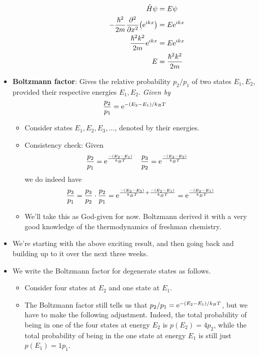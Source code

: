 \documentclass[../notes.tex]{subfiles}
\begin{document}
\begin{itemize}
\begin{itemize}
\begin{itemize}
            \begin{align*}
                \hat{H}\psi &= E\psi\\
                -\frac{\hbar^2}{2m}\pdv[2]{x}(\e[ikx]) &= E\e[ikx]\\
                \frac{\hbar^2k^2}{2m}\e[ikx] &= E\e[ikx]\\
                E &= \frac{\hbar^2k^2}{2m}
            \end{align*}
        \end{itemize}
    \end{itemize}
    \item \textbf{Boltzmann factor}: Gives the relative probability $p_2/p_1$ of two states $E_1,E_2$, provided their respective energies $E_1,E_2$. \emph{Given by}
    \begin{equation*}
        \frac{p_2}{p_1} = \e[-(E_2-E_1)/k_BT]
    \end{equation*}
    \begin{itemize}
        \item Consider states $E_1,E_2,E_3,\dots$, denoted by their energies.
        \item Consistency check: Given
        \begin{align*}
            \frac{p_2}{p_1} &= \e[\frac{-(E_2-E_1)}{k_BT}]&
            \frac{p_3}{p_2} &= \e[\frac{-(E_3-E_2)}{k_BT}]
        \end{align*}
        we do indeed have
        \begin{equation*}
            \frac{p_3}{p_1} = \frac{p_3}{p_2}\cdot\frac{p_2}{p_1}
            = \e[\frac{-(E_3-E_2)}{k_BT}+\frac{-(E_2-E_1)}{k_BT}]
            = \e[\frac{-(E_3-E_1)}{k_BT}]
        \end{equation*}
        \item We'll take this as God-given for now. Boltzmann derived it with a very good knowledge of the thermodynamics of freshman chemistry.
    \end{itemize}
    \item We're starting with the above exciting result, and then going back and building up to it over the next three weeks.
    \item We write the Boltzmann factor for degenerate states as follows.
    \begin{itemize}
        \item Consider four states at $E_2$ and one state at $E_1$.
        \item The Boltzmann factor still tells us that $p_2/p_1=\e[-(E_2-E_1)/k_BT]$, but we have to make the following adjustment. Indeed, the total probability of being in one of the four states at energy $E_2$ is $p(E_2)=4p_2$, while the total probability of being in the one state at energy $E_1$ is still just $p(E_1)=1p_1$.

\end{itemize}
\end{itemize}
\end{document}
